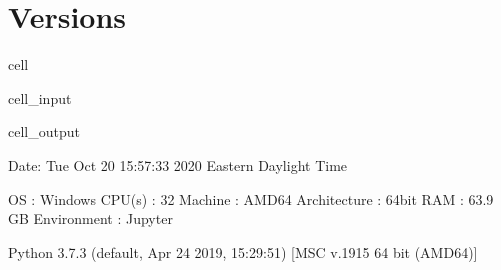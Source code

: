 \documentclass[letterpaper,10pt,english]{jupyterBook}
\begin{document}
\section{Versions}
\label{\detokenize{testChpt/ePSproc_class_demo_161020:versions}}
\begin{sphinxuseclass}{cell}\begin{sphinxVerbatimInput}

\begin{sphinxuseclass}{cell_input}
\begin{sphinxVerbatim}[commandchars=\\\{\}]
 
\PYG{p}{[}  \PYG{p}{]}
\end{sphinxVerbatim}

\end{sphinxuseclass}\end{sphinxVerbatimInput}
\begin{sphinxVerbatimOutput}

\begin{sphinxuseclass}{cell_output}
\begin{sphinxVerbatim}[commandchars=\\\{\}]
\PYGZhy{}\PYGZhy{}\PYGZhy{}\PYGZhy{}\PYGZhy{}\PYGZhy{}\PYGZhy{}\PYGZhy{}\PYGZhy{}\PYGZhy{}\PYGZhy{}\PYGZhy{}\PYGZhy{}\PYGZhy{}\PYGZhy{}\PYGZhy{}\PYGZhy{}\PYGZhy{}\PYGZhy{}\PYGZhy{}\PYGZhy{}\PYGZhy{}\PYGZhy{}\PYGZhy{}\PYGZhy{}\PYGZhy{}\PYGZhy{}\PYGZhy{}\PYGZhy{}\PYGZhy{}\PYGZhy{}\PYGZhy{}\PYGZhy{}\PYGZhy{}\PYGZhy{}\PYGZhy{}\PYGZhy{}\PYGZhy{}\PYGZhy{}\PYGZhy{}\PYGZhy{}\PYGZhy{}\PYGZhy{}\PYGZhy{}\PYGZhy{}\PYGZhy{}\PYGZhy{}\PYGZhy{}\PYGZhy{}\PYGZhy{}\PYGZhy{}\PYGZhy{}\PYGZhy{}\PYGZhy{}\PYGZhy{}\PYGZhy{}\PYGZhy{}\PYGZhy{}\PYGZhy{}\PYGZhy{}\PYGZhy{}\PYGZhy{}\PYGZhy{}\PYGZhy{}\PYGZhy{}\PYGZhy{}\PYGZhy{}\PYGZhy{}\PYGZhy{}\PYGZhy{}\PYGZhy{}\PYGZhy{}\PYGZhy{}\PYGZhy{}\PYGZhy{}\PYGZhy{}\PYGZhy{}\PYGZhy{}\PYGZhy{}\PYGZhy{}
  Date: Tue Oct 20 15:57:33 2020 Eastern Daylight Time

                OS : Windows
            CPU(s) : 32
           Machine : AMD64
      Architecture : 64bit
               RAM : 63.9 GB
       Environment : Jupyter

  Python 3.7.3 (default, Apr 24 2019, 15:29:51) [MSC v.1915 64 bit (AMD64)]


\end{sphinxVerbatim}
\end{sphinxuseclass}
\end{sphinxVerbatimOutput}
\end{sphinxuseclass}
\end{document}
